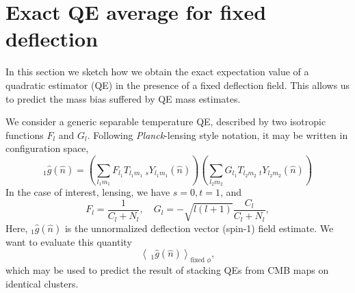 \documentclass[prd, superscriptaddress, tightenlines, longbibliography, nofootinbib, eqsecnum, amsfonts, amsmath, floatfix, twocolumn, notitlepage]{revtex4-2}
\newcommand{\av}[1]{\left \langle #1\right\rangle}
\newcommand{\bs}[1]{\boldsymbol{#1}}
\begin{document}



\section{Exact QE average for fixed deflection}\label{A1}
\newcommand{\hn}[0]{\hat n}
In this section we sketch how we obtain the exact expectation value of a quadratic estimator (QE) in the presence of a fixed deflection field. This allows us to predict the mass bias suffered by QE mass estimates.

We consider a generic separable temperature QE, described by two isotropic functions $F_l$ and $G_l$. Following \emph{Planck}-lensing style notation, it may be written in configuration space,
\begin{equation}
	_{1}\hat g(\hat n) = \left( \sum_{l_1m_1} F_{l_1} T_{l_1m_1}\:_sY_{l_1m_1}(\hn) \right) \left( \sum_{l_2m_2} G_{l_1} T_{l_2m_2}\:_tY_{l_2m_2}(\hn) \right) 
\end{equation}
In the case of interest, lensing, we have $s =0, t = 1$, and
\begin{equation}
	F_l = \frac{1}{C_l + N_l}, \quad G_l = - \sqrt{l(l+ 1)}\frac{C_l}{C_l + N_l},
\end{equation}
Here, $_{1} \hat g(\hat n)$ is the unnormalized deflection vector (spin-1) field estimate. We want to evaluate this quantity
\begin{equation} \label{eq:avg}
	\av{\: _{1}\hat g(\hat n)}_{\text{fixed $\phi$}},
\end{equation}
which may be used to predict the result of stacking QEs from CMB maps on identical clusters.
\end{document}
